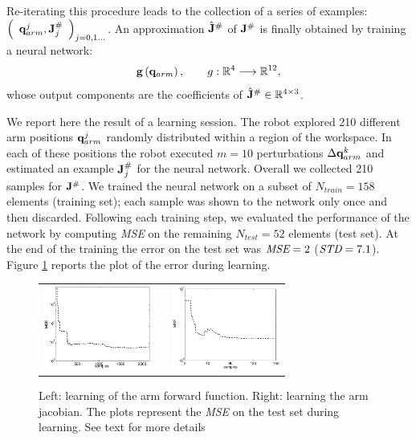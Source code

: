 Re-iterating this procedure leads to the collection of a series of examples:
$  \left(\begin{array}{cc}
    \mathbf q_{arm}^j , \mathbf J_j^\# \end{array}\right)_{j = 0,1\dots}$.
An approximation $\hat{\mathbf J}^\#$ of $\mathbf J^\#$ is finally
obtained by training a neural network:
%
\begin{equation}
\mathbf{g}\left(\mathbf q_{arm}\right), \qquad g : \mathbb R^4 \longrightarrow \mathbb R^{12},
\end{equation}
%
whose output components are the coefficients of 
$\hat{\mathbf J}^\# \in \mathbb R^{4 \times 3}$.

We report here the result of a learning session. The robot explored 210 
different arm positions $\mathbf q_{arm}^j$ randomly distributed within a region of 
the workspace. In each of these positions the robot executed $m=10$ 
perturbations $\Delta \mathbf {q}_{arm}^k$ and estimated an example $\mathbf J^\#_j$ for 
the neural network. Overall we collected 210 samples for $\mathbf J^\#$. 
We trained the neural network on a subset of $N_{train}=158$ elements 
(training set); each 
sample was shown to the network only once and then discarded. Following each 
training step, we evaluated the performance of the network by computing 
\emph{MSE} on the remaining $N_{test}=52$ elements 
(test set). At the 
end of the training the error on the test set was $\emph{MSE}=2$ 
($\emph{STD}=7.1$). Figure \ref{Fig:learningerrors} reports the plot of 
the error during learning.
%
\begin{figure}
  \begin{center}
	\begin{tabular}{ccc}
	  \parbox{30mm}{\includegraphics[width=35mm]{./Figure/reachingError1.eps}}  & \hspace{.1cm} &
	  \parbox{30mm}{\includegraphics[width=35mm]{./Figure/jacobian-error.eps}}
  \end{tabular}
\end{center}
\caption{Left: learning of the arm forward function. Right: learning the 
arm jacobian. The plots represent the \emph{MSE} on 
the test set during learning. See text for more details}\label{Fig:learningerrors}
\end{figure}

